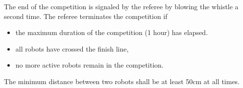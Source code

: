 \documentclass[12pt]{hurocup}
\begin{document}
\begin{lawlist}[MR]
\item The end of the competition is signaled by the referee by blowing
  the whistle a second time. The referee terminates the competition
  if
  \begin{itemize}
    \item the maximum duration of the competition (1 hour) has
      elapsed.
  \item all robots have crossed the finish line,
  \item no more active robots remain in the competition.
  \end{itemize}

\end{lawlist}

\begin{decisions}
\item The minimum distance between two robots shall be at least 50cm
  at all times. 
\end{decisions}

\end{document}
